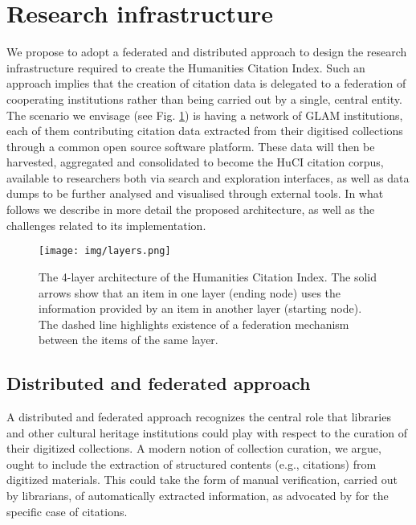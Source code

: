 \section{Research infrastructure}\label{sec:research-infrastructure}

We propose to adopt a federated and distributed approach to design the research infrastructure required to create the Humanities Citation Index. Such an approach implies that the creation of citation data is delegated to a federation of cooperating institutions rather than being carried out by a single, central entity. The scenario we envisage (see Fig. \ref{fig:huci-high-level}) is having a network of GLAM institutions, each of them contributing citation data extracted from their digitised collections through a common open source software platform. These data will then be harvested, aggregated and consolidated to become the HuCI citation corpus, available to researchers both via search and exploration interfaces, as well as data dumps to be further analysed and visualised through external tools. In what follows we describe in more detail the proposed architecture, as well as the challenges related to its implementation.

\begin{figure}[h]%
\centering
\texttt{[image: img/layers.png]}
\caption{The 4-layer architecture of the Humanities Citation Index. The solid arrows show that an item in one layer (ending node) uses the information provided by an item in another layer (starting node). The dashed line highlights existence of a federation mechanism between the items of the same layer.
\label{fig:huci-high-level}}
\end{figure}

\subsection{Distributed and federated approach}

A distributed and federated approach recognizes the central role that libraries and other cultural heritage institutions could play with respect to the curation of their digitized collections. A modern notion of collection curation, we argue, ought to include the extraction of structured contents (e.g., citations) from digitized materials. This could take the form of manual verification, carried out by librarians, of automatically extracted information, as advocated by \cite{lauscher_linked_2018} for the specific case of citations.   

